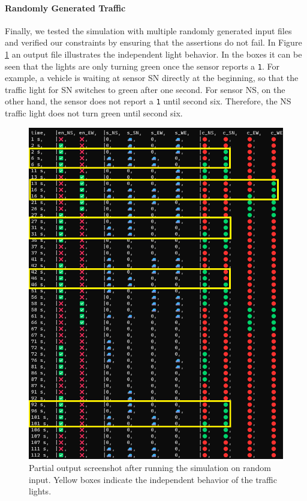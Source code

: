 \documentclass[10pt,bibliography=totocnumbered,listof=totocnumbered, footsepline, headsepline]{scrreprt}
\begin{document}
    \paragraph*{Randomly Generated Traffic}
    Finally, we tested the simulation with multiple randomly generated input files and verified our constraints by ensuring that the assertions do not fail. In Figure \ref{fig:independent_traffic} an output file illustrates the independent light behavior. In the boxes it can be seen that the lights are only turning green once the sensor reports a \texttt{1}. For example, a vehicle is waiting at sensor SN directly at the beginning, so that the traffic light for SN switches to green after one second. For sensor NS, on the other hand, the sensor does not report a \texttt{1} until second six. Therefore, the NS traffic light does not turn green until second six. 
    \begin{figure}[H]
    	\centerline{\includegraphics[width=34pc]{random_input_independence.png}}
    	\caption{Partial output screenshot after running the simulation on random input. Yellow boxes indicate the independent behavior of the traffic lights.}
    	\label{fig:independent_traffic}
    \end{figure}
    
\end{document}
